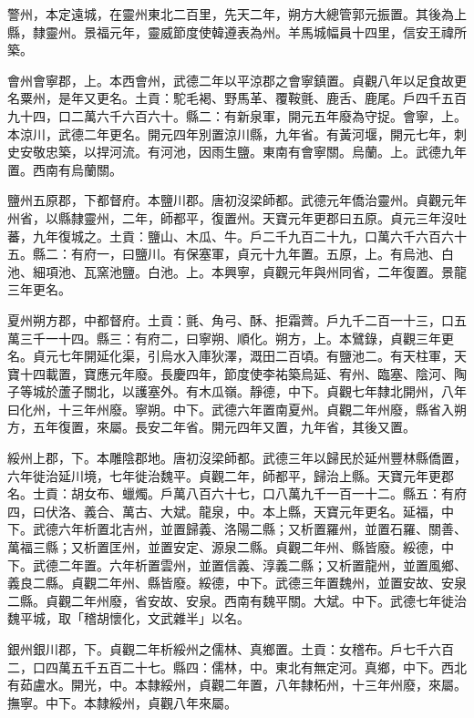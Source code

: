 \begin{pinyinscope}
 警州，本定遠城，在靈州東北二百里，先天二年，朔方大總管郭元振置。其後為上縣，隸靈州。景福元年，靈威節度使韓遵表為州。羊馬城幅員十四里，信安王禕所築。



 會州會寧郡，上。本西會州，武德二年以平涼郡之會寧鎮置。貞觀八年以足食故更名粟州，是年又更名。土貢：駝毛褐、野馬革、覆鞍氈、鹿舌、鹿尾。戶四千五百九十四，口二萬六千六百六十。縣二：有新泉軍，開元五年廢為守捉。會寧，上。本涼川，武德二年更名。開元四年別置涼川縣，九年省。有黃河堰，開元七年，刺史安敬忠築，以捍河流。有河池，因雨生鹽。東南有會寧關。烏蘭。上。武德九年置。西南有烏蘭關。



 鹽州五原郡，下都督府。本鹽川郡。唐初沒梁師都。武德元年僑治靈州。貞觀元年州省，以縣隸靈州，二年，師都平，復置州。天寶元年更郡曰五原。貞元三年沒吐蕃，九年復城之。土貢：鹽山、木瓜、牛。戶二千九百二十九，口萬六千六百六十五。縣二：有府一，曰鹽川。有保塞軍，貞元十九年置。五原，上。有烏池、白池、細項池、瓦窯池鹽。白池。上。本興寧，貞觀元年與州同省，二年復置。景龍三年更名。



 夏州朔方郡，中都督府。土貢：氈、角弓、酥、拒霜薺。戶九千二百一十三，口五萬三千一十四。縣三：有府二，曰寧朔、順化。朔方，上。本鷿錄，貞觀三年更名。貞元七年開延化渠，引烏水入庫狄澤，溉田二百頃。有鹽池二。有天柱軍，天寶十四載置，寶應元年廢。長慶四年，節度使李祐築烏延、宥州、臨塞、陰河、陶子等城於蘆子關北，以護塞外。有木瓜嶺。靜德，中下。貞觀七年隸北開州，八年曰化州，十三年州廢。寧朔。中下。武德六年置南夏州。貞觀二年州廢，縣省入朔方，五年復置，來屬。長安二年省。開元四年又置，九年省，其後又置。



 綏州上郡，下。本雕陰郡地。唐初沒梁師都。武德三年以歸民於延州豐林縣僑置，六年徙治延川境，七年徙治魏平。貞觀二年，師都平，歸治上縣。天寶元年更郡名。士貢：胡女布、蠟燭。戶萬八百六十七，口八萬九千一百一十二。縣五：有府四，曰伏洛、義合、萬古、大斌。龍泉，中。本上縣，天寶元年更名。延福，中下。武德六年析置北吉州，並置歸義、洛陽二縣；又析置羅州，並置石羅、關善、萬福三縣；又析置匡州，並置安定、源泉二縣。貞觀二年州、縣皆廢。綏德，中下。武德二年置。六年析置雲州，並置信義、淳義二縣；又析置龍州，並置風鄉、義良二縣。貞觀二年州、縣皆廢。綏德，中下。武德三年置魏州，並置安故、安泉二縣。貞觀二年州廢，省安故、安泉。西南有魏平關。大斌。中下。武德七年徙治魏平城，取「稽胡懷化，文武雜半」以名。



 銀州銀川郡，下。貞觀二年析綏州之儒林、真鄉置。土貢：女稽布。戶七千六百二，口四萬五千五百二十七。縣四：儒林，中。東北有無定河。真鄉，中下。西北有茹盧水。開光，中。本隸綏州，貞觀二年置，八年隸柘州，十三年州廢，來屬。撫寧。中下。本隸綏州，貞觀八年來屬。




\end{pinyinscope}
